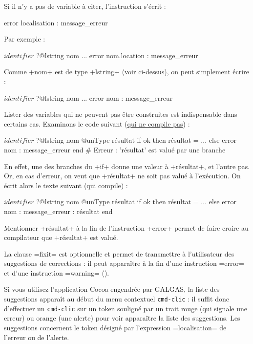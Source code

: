 Si il n'y a pas de variable à citer, l'instruction s'écrit :
\begin{galgas}
error localisation : message_erreur
\end{galgas}

Par exemple :

\begin{galgas}
$identifier$ ?@lstring nom
...
error nom.location : message_erreur
\end{galgas}

Comme \ggs+nom+ est de type \ggs+lstring+ (voir ci-dessus), on peut simplement écrire :
\begin{galgas}
$identifier$ ?@lstring nom
...
error nom : message_erreur
\end{galgas}



Lister des variables qui ne peuvent pas être construites est indispensable dans certains cas. Examinons le code suivant (\underline{qui ne compile pas}) :
\begin{galgas}
$identifier$ ?@lstring nom
@unType résultat
if ok then
  résultat = ...
else
  error nom : message_erreur
end # Erreur : 'résultat' est valué par une branche
\end{galgas}

En effet, une des branches du \ggs+if+ donne une valeur à \ggs+résultat+, et l'autre pas. Or, en cas d'erreur, on veut que \ggs+résultat+ ne soit pas valué à l'exécution. On écrit alors le texte suivant (qui compile) :
\begin{galgas}
$identifier$ ?@lstring nom
@unType résultat
if ok then
  résultat = ...
else
  error nom : message_erreur : résultat
end
\end{galgas}

Mentionner \ggs+résultat+ à la fin de l'instruction \ggs+error+ permet de faire croire au compilateur que \ggs+résultat+ est valué.



La clause \ggs=fixit= est optionnelle et permet de transmettre à l'utilisateur des suggestions de corrections : il peut apparaître à la fin d'une instruction \ggs=error= et d'une instruction \ggs=warning= ().

Si vous utilisez l'application Cocoa engendrée par GALGAS, la liste des suggestions apparaît au début du menu contextuel \texttt{cmd-clic} : il suffit donc d'effectuer un \texttt{cmd-clic} sur un token souligné par un trait rouge (qui signale une erreur) ou orange (une alerte) pour voir apparaître la liste des suggestions. Les suggestions concernent le token désigné par l'expression \ggs=localisation= de l'erreur ou de l'alerte.

